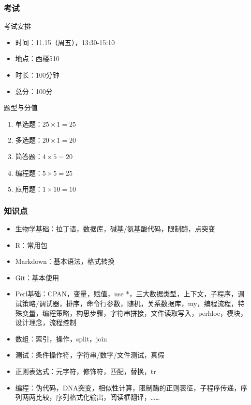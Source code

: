 \begin{frame}[plain]
\end{frame}

\begin{frame}
  \frametitle{考试}
  \begin{block}{考试安排}
    \begin{itemize}
      \item 时间：11.15（周五），13:30-15:10
      \item 地点：西楼510
      \item 时长：100分钟
      \item 总分：100分
    \end{itemize}
  \end{block}
  \pause
  \begin{block}{题型与分值}
    \begin{enumerate}
      \item 单选题：$25 \times 1  = 25$
      \item 多选题：$20 \times 1  = 20$
      \item 简答题：$4  \times 5  = 20$
      \item 编程题：$5  \times 5  = 25$
      \item 应用题：$1  \times 10 = 10$
    \end{enumerate}
  \end{block}
\end{frame}

\begin{frame}
  \frametitle{知识点}
  \begin{itemize}
    \item 生物学基础：拉丁语，数据库，碱基/氨基酸代码，限制酶，点突变
    \item R：常用包
    \item Markdown：基本语法，格式转换
    \item Git：基本使用
    \item Perl基础：CPAN，变量，赋值，use *，三大数据类型，上下文，子程序，调试策略/调试器，排序，命令行参数，随机，关系数据库，my，编程流程，特殊变量，编程策略，构思步骤，字符串拼接，文件读取写入，perldoc，模块，设计理念，流程控制
    \item 数组：索引，操作，split，join
    \item 测试：条件操作符，字符串/数字/文件测试，真假
    \item 正则表达式：元字符，修饰符，匹配，替换，tr
    \item 编程：伪代码，DNA突变，相似性计算，限制酶的正则表征，子程序传递，序列两两比较，序列格式化输出，阅读框翻译，……
  \end{itemize}
\end{frame}

